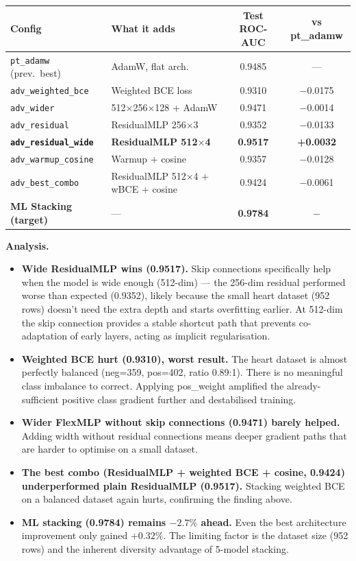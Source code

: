 \documentclass[11pt,a4paper]{article}
\begin{document}
\begin{center}
\small
\begin{tabular}{llcc}
\toprule
\textbf{Config} & \textbf{What it adds} & \textbf{Test ROC-AUC} & \textbf{vs pt\_adamw} \\
\midrule
\texttt{pt\_adamw} (prev.\ best)   & AdamW, flat arch.   & 0.9485 & --- \\
\midrule
\texttt{adv\_weighted\_bce} & Weighted BCE loss  & 0.9310 & $-$0.0175 \\
\texttt{adv\_wider}         & 512$\times$256$\times$128 + AdamW & 0.9471 & $-$0.0014 \\
\texttt{adv\_residual}      & ResidualMLP 256$\times$3 & 0.9352 & $-$0.0133 \\
\textbf{\texttt{adv\_residual\_wide}} & \textbf{ResidualMLP 512$\times$4} & \textbf{0.9517} & \textbf{+0.0032} \\
\texttt{adv\_warmup\_cosine}& Warmup + cosine    & 0.9357 & $-$0.0128 \\
\texttt{adv\_best\_combo}   & ResidualMLP 512$\times$4 + wBCE + cosine & 0.9424 & $-$0.0061 \\
\midrule
\textbf{ML Stacking (target)} & --- & \textbf{0.9784} & $-$ \\
\bottomrule
\end{tabular}
\end{center}

\textbf{Analysis.}
\begin{itemize}[leftmargin=1.2em,itemsep=0.15em]
    \item \textbf{Wide ResidualMLP wins (0.9517).} Skip connections specifically help when the model is wide enough (512-dim) ---
    the 256-dim residual performed worse than expected (0.9352), likely because the small heart dataset (952 rows) doesn't need
    the extra depth and starts overfitting earlier. At 512-dim the skip connection provides a stable shortcut path that prevents
    co-adaptation of early layers, acting as implicit regularisation.
    \item \textbf{Weighted BCE hurt (0.9310), worst result.} The heart dataset is almost perfectly balanced (neg=359, pos=402,
    ratio 0.89:1). There is no meaningful class imbalance to correct. Applying pos\_weight amplified the
    already-sufficient positive class gradient further and destabilised training.
    \item \textbf{Wider FlexMLP without skip connections (0.9471) barely helped.} Adding width without residual connections
    means deeper gradient paths that are harder to optimise on a small dataset.
    \item \textbf{The best combo (ResidualMLP + weighted BCE + cosine, 0.9424) underperformed plain ResidualMLP (0.9517).}
    Stacking weighted BCE on a balanced dataset again hurts, confirming the finding above.
    \item \textbf{ML stacking (0.9784) remains $-2.7\%$ ahead.} Even the best architecture improvement only gained $+0.32\%$.
    The limiting factor is the dataset size (952 rows) and the inherent diversity advantage of 5-model stacking.
\end{itemize}
\end{document}
